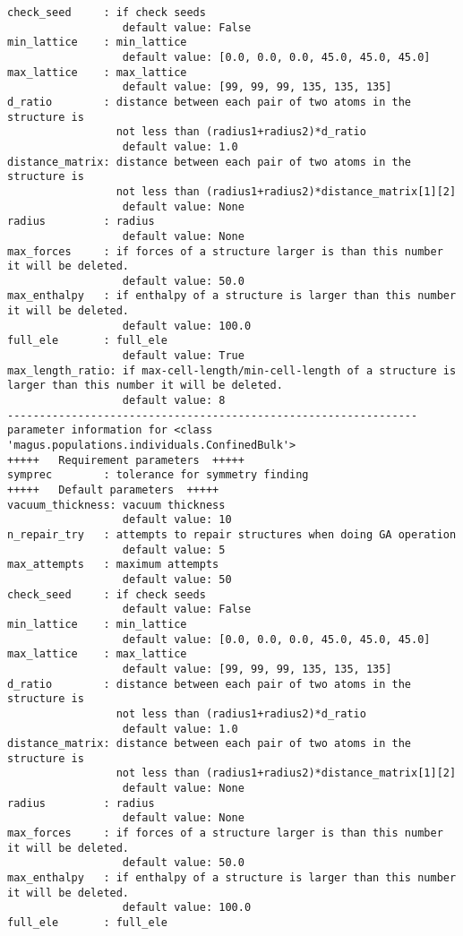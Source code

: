 \documentclass[12pt,oneside]{book}
\begin{document}
\begin{tcolorbox}
\begin{verbatim}
check_seed     : if check seeds
                  default value: False
min_lattice    : min_lattice
                  default value: [0.0, 0.0, 0.0, 45.0, 45.0, 45.0]
max_lattice    : max_lattice
                  default value: [99, 99, 99, 135, 135, 135]
d_ratio        : distance between each pair of two atoms in the structure is
                 not less than (radius1+radius2)*d_ratio
                  default value: 1.0
distance_matrix: distance between each pair of two atoms in the structure is
                 not less than (radius1+radius2)*distance_matrix[1][2]
                  default value: None
radius         : radius
                  default value: None
max_forces     : if forces of a structure larger is than this number it will be deleted.
                  default value: 50.0
max_enthalpy   : if enthalpy of a structure is larger than this number it will be deleted.
                  default value: 100.0
full_ele       : full_ele
                  default value: True
max_length_ratio: if max-cell-length/min-cell-length of a structure is larger than this number it will be deleted.
                  default value: 8
----------------------------------------------------------------
parameter information for <class 'magus.populations.individuals.ConfinedBulk'>
+++++	Requirement parameters	+++++
symprec        : tolerance for symmetry finding
+++++	Default parameters	+++++
vacuum_thickness: vacuum thickness
                  default value: 10
n_repair_try   : attempts to repair structures when doing GA operation
                  default value: 5
max_attempts   : maximum attempts
                  default value: 50
check_seed     : if check seeds
                  default value: False
min_lattice    : min_lattice
                  default value: [0.0, 0.0, 0.0, 45.0, 45.0, 45.0]
max_lattice    : max_lattice
                  default value: [99, 99, 99, 135, 135, 135]
d_ratio        : distance between each pair of two atoms in the structure is
                 not less than (radius1+radius2)*d_ratio
                  default value: 1.0
distance_matrix: distance between each pair of two atoms in the structure is
                 not less than (radius1+radius2)*distance_matrix[1][2]
                  default value: None
radius         : radius
                  default value: None
max_forces     : if forces of a structure larger is than this number it will be deleted.
                  default value: 50.0
max_enthalpy   : if enthalpy of a structure is larger than this number it will be deleted.
                  default value: 100.0
full_ele       : full_ele

\end{verbatim}
\end{tcolorbox}
\end{document}
